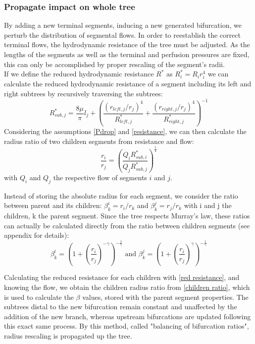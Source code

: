 \documentclass[a4paper, 11pt]{article} %
\begin{document}
\subsubsection{Propagate impact on whole tree}
\label{propagate}
By adding a new terminal segments, inducing a new generated bifurcation, we perturb the distribution of segmental flows. In order to reestablish the correct terminal flows, the hydrodynamic resistance of the tree must be adjusted. As the lengths of the segments as well as the terminal and perfusion pressures are fixed, this can only be accomplished by proper rescaling of the segment's radii.\\

If we define the reduced hydrodynamic resistance $R^*$ as $R^*_i = R_i r_i^4$ we can calculate the reduced hydrodynamic resistance of a segment including its left and right subtrees by recursively traversing the subtrees:
\begin{equation} \label{red resistance}
R^*_{sub,j} = \frac{8\mu}{\pi}l_j + \left( \frac{(r_{left,j}/r_j)^4}{R_{left,j}^*} + \frac{(r_{right,j}/r_j)^4}{R_{right,j}^*}\right)^{-1}
\end{equation}
Considering the assumptions \ref{Pdrop} and \ref{resistance}, we can then calculate the radius ratio of two children segments from resistance and flow:
\begin{equation} \label{children ratio}
\frac{r_i}{r_j} = \left(\frac{Q_iR_{sub,i}^*}{Q_jR_{sub,j}^*}\right)^\frac{1}{4}
\end{equation}
with $Q_i$ and $Q_j$ the respective flow of segments $i$ and $j$.

Instead of storing the absolute radius for each segment, we consider the ratio between parent and its children: $\beta^i_k = r_i / r_k$ and $\beta^j_k = r_j / r_k$ with i and j the children, k the parent segment. Since the tree respects Murray's law, these ratios can actually be calculated directly from the ratio between children segments (see appendix for details):
\begin{equation}
\beta^i_k = \left( 1 + (\frac{r_i}{r_j})^{-\gamma}\right)^{-\frac{1}{\gamma}} \text{ and }
\beta^j_k = \left( 1 + (\frac{r_i}{r_j})^{\gamma}\right)^{-\frac{1}{\gamma}}
\end{equation}


Calculating the reduced resistance for each children with \eqref{red resistance}, and knowing the flow, we obtain the children radius ratio from \eqref{children ratio}, which is used to calculate the $\beta$ values, stored with the parent segment properties. 
The subtrees distal to the new bifurcation remain constant and unaffected by the addition of the new branch, whereas upstream bifurcations are updated following this exact same process. By this method, called "balancing of bifurcation ratios", radius rescaling is propagated up the tree.
 
\end{document}
